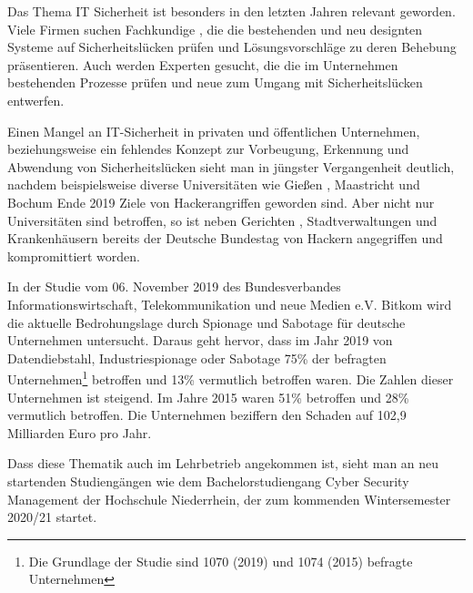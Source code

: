 \label{chap_text:Einleitung}
Das Thema IT Sicherheit ist besonders in den letzten Jahren relevant geworden. Viele Firmen suchen Fachkundige \cite{it-daily.netITSecurityExpertenWerdenHanderingend2019}, die die bestehenden und neu designten Systeme auf Sicherheitslücken prüfen und Lösungsvorschläge zu deren Behebung präsentieren. Auch werden Experten gesucht, die die im Unternehmen bestehenden Prozesse prüfen und neue zum Umgang mit Sicherheitslücken entwerfen.

Einen Mangel an IT-Sicherheit in privaten und öffentlichen Unternehmen, beziehungsweise ein fehlendes Konzept zur Vorbeugung, Erkennung und Abwendung von Sicherheitslücken sieht man in jüngster Vergangenheit deutlich, nachdem beispielsweise diverse Universitäten wie Gießen \cite{schirmacherUniGiessenNaehert2020}, Maastricht \cite{wdrCyberattackeHackerangriffAuf2019} und Bochum \cite{ruhr24HackerAngriffLegtITSysteme2020} Ende 2019 Ziele von Hackerangriffen geworden sind. Aber nicht nur Universitäten sind betroffen, so ist neben Gerichten \cite{hurtzHackerAngriffAufGericht2020}, Stadtverwaltungen \cite{barsigCyberAttackeAufPotsdamer2020} und Krankenhäusern \cite{wellbrockITSicherheitImKrankenhaus2019} bereits der Deutsche Bundestag von Hackern angegriffen und kompromittiert worden. \cite{fladeCyberangriffAufBundestag2020}

In der Studie  vom 06. November 2019 des Bundesverbandes Informationswirtschaft, Telekommunikation und neue Medien e.V. Bitkom wird die aktuelle Bedrohungslage durch Spionage und Sabotage für deutsche Unternehmen untersucht. Daraus geht hervor, dass im Jahr 2019 von Datendiebstahl, Industriespionage oder Sabotage 75\% der befragten Unternehmen\footnote{Die Grundlage der Studie sind 1070 (2019) und 1074 (2015) befragte Unternehmen} betroffen  und 13\% vermutlich betroffen waren. Die Zahlen dieser Unternehmen ist steigend. Im Jahre 2015 waren  51\% betroffen und 28\% vermutlich betroffen. Die Unternehmen beziffern den Schaden auf 102,9 Milliarden Euro pro Jahr. \cite{bergWirtschaftsschutzDigitalenWelt2019}

Dass diese Thematik auch im Lehrbetrieb angekommen ist, sieht man an neu startenden Studiengängen wie dem Bachelorstudiengang Cyber Security Management der Hochschule Niederrhein, der zum kommenden Wintersemester 2020/21 startet. \cite{hochschuleniederrheinHackernRoteKarte2020}

